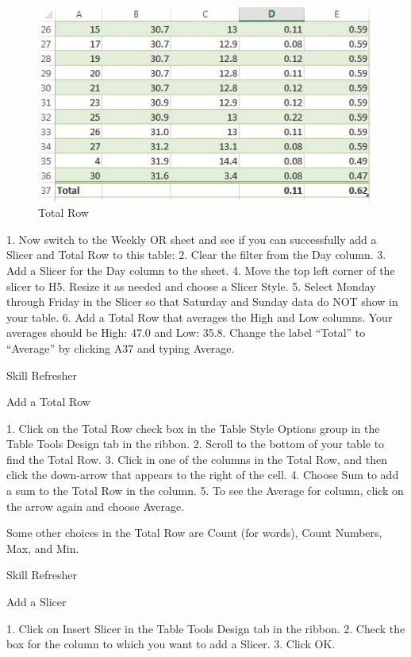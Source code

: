 \begin{figure}[H]
	\centering
	\includegraphics[width=\maxwidth{.95\linewidth}]{gfx/ch05_fig22}
	\caption{Total Row}
	\label{05:fig22}
\end{figure}





1. Now switch to the Weekly OR sheet and see if you can successfully add a Slicer and Total Row
to this table:
2. Clear the filter from the Day column.
3. Add a Slicer for the Day column to the sheet.
4. Move the top left corner of the slicer to H5. Resize it as needed and choose a Slicer Style.
5. Select Monday through Friday in the Slicer so that Saturday and Sunday data do NOT show in
your table.
6. Add a Total Row that averages the High and Low columns. Your averages should be High: 47.0
and Low: 35.8. Change the label “Total” to “Average” by clicking A37 and typing Average.


Skill Refresher


Add a Total Row

1. Click on the Total Row check box in the Table Style Options group in the Table Tools Design tab in the
ribbon.
2. Scroll to the bottom of your table to find the Total Row.
3. Click in one of the columns in the Total Row, and then click the down-arrow that appears to the right of
the cell.
4. Choose Sum to add a sum to the Total Row in the column.
5. To see the Average for column, click on the arrow again and choose Average.

Some other choices in the Total Row are Count (for words), Count Numbers, Max, and Min.




Skill Refresher


Add a Slicer



1. Click on Insert Slicer in the Table Tools Design tab in the ribbon.
2. Check the box for the column to which you want to add a Slicer.
3. Click OK.



